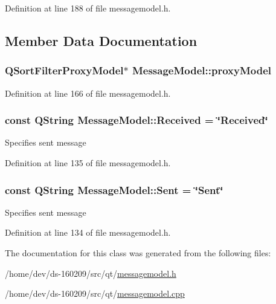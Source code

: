 Definition at line 188 of file messagemodel.\+h.



\subsection{Member Data Documentation}
\hypertarget{class_message_model_a8248581c9ad7c1f00c4918f4b8b82404}{}
\subsubsection[{proxy\+Model}]{\setlength{\rightskip}{0pt plus 5cm}Q\+Sort\+Filter\+Proxy\+Model$\ast$ Message\+Model\+::proxy\+Model}\label{class_message_model_a8248581c9ad7c1f00c4918f4b8b82404}


Definition at line 166 of file messagemodel.\+h.

\hypertarget{class_message_model_a8539de55f3325f8237617fb50d7f632c}{}
\subsubsection[{Received}]{\setlength{\rightskip}{0pt plus 5cm}const Q\+String Message\+Model\+::\+Received = \char`\"{}Received\char`\"{}\hspace{0.3cm}{\ttfamily [static]}}\label{class_message_model_a8539de55f3325f8237617fb50d7f632c}
Specifies sent message 

Definition at line 135 of file messagemodel.\+h.

\hypertarget{class_message_model_ae5014d3052e4cec590f673d22edb9cd0}{}
\subsubsection[{Sent}]{\setlength{\rightskip}{0pt plus 5cm}const Q\+String Message\+Model\+::\+Sent = \char`\"{}Sent\char`\"{}\hspace{0.3cm}{\ttfamily [static]}}\label{class_message_model_ae5014d3052e4cec590f673d22edb9cd0}
Specifies sent message 

Definition at line 134 of file messagemodel.\+h.



The documentation for this class was generated from the following files\+:\begin{DoxyCompactItemize}
\item 
/home/dev/ds-\/160209/src/qt/\hyperlink{messagemodel_8h}{messagemodel.\+h}\item 
/home/dev/ds-\/160209/src/qt/\hyperlink{messagemodel_8cpp}{messagemodel.\+cpp}\end{DoxyCompactItemize}
